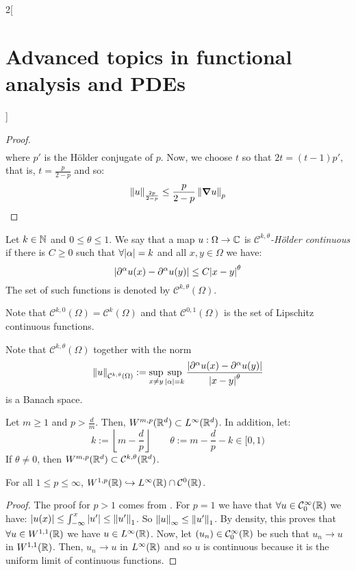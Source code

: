 \documentclass[../../../main_math.tex]{subfiles}
\begin{document}
\begin{multicols}{2}[\section{Advanced topics in functional analysis and PDEs}]
\begin{proof}
\begin{multline*}
    \end{multline*}
    where $p'$ is the Hölder conjugate of $p$. Now, we choose $t$ so that $2t=(t-1)p'$, that is, $t=\frac{p}{2-p}$ and so:
    $$
      \left\|u\right\|_{\frac{2p}{2-p}}\leq \frac{p}{2-p}\left\|\grad u\right\|_p
    $$
  \end{proof}
  \begin{definition}
    Let $k\in\mathbb{N}$ and $0\leq\theta\leq 1$. We say that a map $u:\Omega\to\mathbb{C}$ is \emph{$\mathcal{C}^{k,\theta}$-Hölder continuous} if there is $C\geq 0$ such that $\forall\abs{\alpha}=k$ and all $x,y\in\Omega$ we have:
    $$
      \abs{\partial^\alpha u(x)-\partial^\alpha u(y)}\leq C\abs{x-y}^\theta
    $$
    The set of such functions is denoted by $\mathcal{C}^{k,\theta}(\Omega)$.
  \end{definition}
  \begin{remark}
    Note that $\mathcal{C}^{k,0}(\Omega)=\mathcal{C}^k(\Omega)$ and that $\mathcal{C}^{0,1}(\Omega)$ is the set of Lipschitz continuous functions.
  \end{remark}
  \begin{remark}
    Note that $\mathcal{C}^{k,\theta}(\Omega)$ together with the norm
    $$
      \left\|u\right\|_{\mathcal{C}^{k,\theta}(\Omega)}:=\sup_{x\ne y}\sup_{\abs{\alpha}=k}\frac{\abs{\partial^\alpha u(x)-\partial^\alpha u(y)}}{\abs{x-y}^\theta}
    $$
    is a Banach space.
  \end{remark}
  \begin{theorem}\label{ATFAPDE:morrey_embedding}
    Let $m\geq 1$ and $p>\frac{d}{m}$. Then, $W^{m,p}(\mathbb{R}^d)\subset L^\infty(\mathbb{R}^d)$. In addition, let:
    $$
      k:=\left\lfloor m-\frac{d}{p}\right\rfloor\qquad\theta:=m-\frac{d}{p}-k\in [0,1)
    $$
    If $\theta\ne 0$, then $W^{m,p}(\mathbb{R}^d)\subset \mathcal{C}^{k,\theta}(\mathbb{R}^d)$.
  \end{theorem}
  \begin{theorem}
    For all $1\leq p\leq \infty$, $W^{1,p}(\mathbb{R})\hookrightarrow L^\infty(\mathbb{R})\cap \mathcal{C}^{0}(\mathbb{R})$.
  \end{theorem}
  \begin{proof}
    The proof for $p>1$ comes from . For $p=1$ we have that $\forall u\in \mathcal{C}_0^\infty(\mathbb{R})$ we have:
    $\abs{u(x)}\leq \int_{-\infty}^x{\abs{u'}}\leq \left\|u'\right\|_1$. So $\left\|u\right\|_\infty\leq \left\|u'\right\|_1$. By density, this proves that $\forall u\in W^{1,1}(\mathbb{R})$ we have $u\in L^\infty(\mathbb{R})$. Now, let $(u_n)\in \mathcal{C}_0^\infty(\mathbb{R})$ be such that $u_n\to u$ in $W^{1,1}(\mathbb{R})$. Then, $u_n\to u$ in $L^\infty(\mathbb{R})$ and so $u$ is continuous because it is the uniform limit of continuous functions.
  \end{proof}

\end{multicols}
\end{document}
